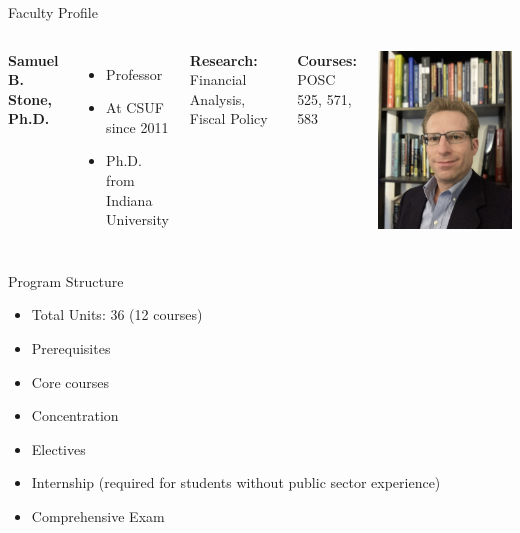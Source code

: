 \documentclass[10pt]{beamer}
\newlength{\imageheight}
\begin{document}
        \begin{frame}{Faculty Profile}
        \begin{columns}[t]
        \textbf{Samuel B. Stone, Ph.D.}
        \begin{itemize}
        \item Professor
        \item At CSUF since 2011
        \item Ph.D. from Indiana University
        \end{itemize}
        
        \textbf{Research:} Financial Analysis, Fiscal Policy
        
        \textbf{Courses:} POSC 525, 571, 583
        
        \vspace*{0.5cm}
        \includegraphics[height=\imageheight]{images/stone.jpg}
        \end{columns}
        \end{frame}

\begin{frame}{Program Structure}
\begin{itemize}
\item Total Units: 36 (12 courses)
\item Prerequisites
\item Core courses
\item Concentration
\item Electives
\item Internship (required for students without public sector experience)
\item Comprehensive Exam
\end{itemize}
\end{frame}
\end{document}
